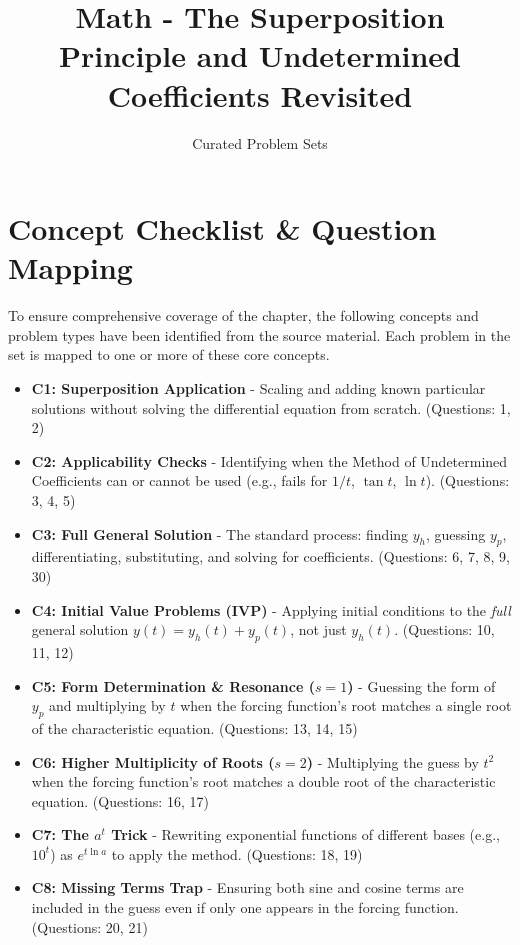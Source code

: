 \documentclass[11pt]{article}
\title{Math - The Superposition Principle and Undetermined Coefficients Revisited}
\author{Curated Problem Sets}
\date{}
\begin{document}
\maketitle

\tableofcontents
\newpage

\section{Concept Checklist \& Question Mapping}
To ensure comprehensive coverage of the chapter, the following concepts and problem types have been identified from the source material. Each problem in the set is mapped to one or more of these core concepts.

\begin{itemize}
    \item \textbf{C1: Superposition Application} - Scaling and adding known particular solutions without solving the differential equation from scratch. (Questions: 1, 2)
    \item \textbf{C2: Applicability Checks} - Identifying when the Method of Undetermined Coefficients can or cannot be used (e.g., fails for $1/t$, $\tan t$, $\ln t$). (Questions: 3, 4, 5)
    \item \textbf{C3: Full General Solution} - The standard process: finding $y_h$, guessing $y_p$, differentiating, substituting, and solving for coefficients. (Questions: 6, 7, 8, 9, 30)
    \item \textbf{C4: Initial Value Problems (IVP)} - Applying initial conditions to the \textit{full} general solution $y(t) = y_h(t) + y_p(t)$, not just $y_h(t)$. (Questions: 10, 11, 12)
    \item \textbf{C5: Form Determination \& Resonance ($s=1$)} - Guessing the form of $y_p$ and multiplying by $t$ when the forcing function's root matches a single root of the characteristic equation. (Questions: 13, 14, 15)
    \item \textbf{C6: Higher Multiplicity of Roots ($s=2$)} - Multiplying the guess by $t^2$ when the forcing function's root matches a double root of the characteristic equation. (Questions: 16, 17)
    \item \textbf{C7: The $a^t$ Trick} - Rewriting exponential functions of different bases (e.g., $10^t$) as $e^{t \ln a}$ to apply the method. (Questions: 18, 19)
    \item \textbf{C8: Missing Terms Trap} - Ensuring both sine and cosine terms are included in the guess even if only one appears in the forcing function. (Questions: 20, 21)

\end{itemize}
\end{document}
